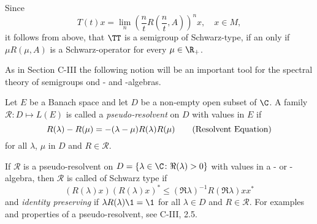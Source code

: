 \begin{remark}\label{rem:d1-2.3}
Since 
%
\[
	T(t)x = \lim_{n} \left( \frac{n}{t} R\left(\frac{n}{t}, A\right) \right)^{n} x , \quad x \in M , 
\]
%
it follows from above, that $ \TT $ is a semigroup of Schwarz-type, if an only if $ \mu R( \mu, A) $ is a Schwarz-operator for every $ \mu \in \R_{+} $.
\end{remark}
As in Section C-III the following notion will be an important tool for the spectral theory of semigroups ond \CA- and \WA-algebras.
\begin{definition}\label{def:d1-2.4}
Let $E$ be a Banach space and let $D$ be a non-empty open subset of $\C$.
A family $ \mathcal{R} \colon D \mapsto L(E) $ is called a \emph{pseudo-resolvent} on $ D $ with values in $ E $ if
\begin{equation}
R(\lambda) - R(\mu) = -(\lambda - \mu)R(\lambda)R(\mu) \tag{{Resolvent Equation}}
\end{equation}
for all $ \lambda $, $ \mu $ in $ D $ and $ R \in \mathcal{R} $.
\end{definition}
If $ \mathcal{R} $ is a {pseudo-resolvent} on $ D = \{\lambda \in \C \colon \Re(\lambda) > 0\} $ with values in a \CA- or \WA-algebra, then $ \mathcal{R} $ is called of Schwarz type if
\[
	(R(\lambda)x)(R(\lambda)x)^{*} \leq (\Re\lambda)^{-1} R(\Re\lambda)xx^{*}
\]
and \emph{identity preserving} if $ \lambda R(\lambda)\1 = \1 $ for all $ \lambda \in D $ and $ R \in \mathcal{R} $.
For examples and properties of a pseudo-resolvent, see C-III, 2.5.

